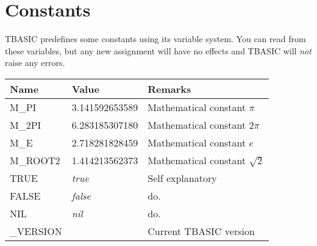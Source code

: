 \section{Constants}

TBASIC predefines some constants using its variable system. You can read from these variables, but any new assignment will have no effects and TBASIC will \emph{not} raise any errors.

\begin{tabularx}{\textwidth}{l l X}
	\textbf{Name} & \textbf{Value} & \textbf{Remarks}
	\\
	\endhead
	M\_PI    & 3.141592653589 & Mathematical constant $\pi$ \\
	M\_2PI   & 6.283185307180 & Mathematical constant $2\pi$ \\
	M\_E     & 2.718281828459 & Mathematical constant $e$ \\
	M\_ROOT2 & 1.414213562373 & Mathematical constant $\sqrt{2}$ \\
	TRUE    & \emph{true} & Self explanatory \\
	FALSE   & \emph{false} & do. \\
	NIL     & \emph{nil} & do. \\
	\_VERSION & \tbasver & Current TBASIC version \\
\end{tabularx}
